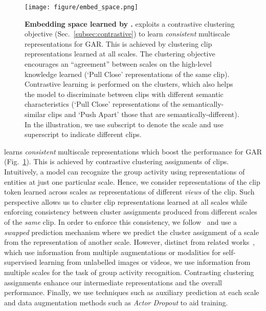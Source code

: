 \documentclass[runningheads]{llncs}
\begin{document}
 
\begin{figure}[t]
\centering
    \texttt{[image: figure/embed\_space.png]}
    \caption{\textbf{Embedding space learned by \ourseos.}
	 \ours exploits a contrastive clustering objective (Sec.~\ref{subsec:contrastive}) to learn \textit{consistent} multiscale representations for GAR. This is achieved
	 by clustering clip representations learned at all scales.
	 The clustering objective encourages an ``agreement'' between scales on the high-level knowledge learned (`Pull Close' representations of the same clip).  Contrastive learning is performed on the clusters, which also helps the model to discriminate between clips 
	 with different semantic characteristics (`Pull Close' representations of the semantically-similar clips and `Push Apart' those that are semantically-different). 
	 In the illustration, we use subscript to denote the scale and use superscript to indicate different clips.}
\label{fig:embedding_space}
\end{figure} 


\ours learns 
\textit{consistent} multiscale representations
which boost the performance for GAR (Fig.~\ref{fig:embedding_space}). This is achieved by
contrastive clustering assignments of clips.
Intuitively,  a model can recognize the group activity using 
representations of entities at just one particular scale. Hence, we consider representations of the clip token learned across scales as representations of different \textit{views} of the clip.  
Such perspective allows us to cluster clip representations learned at all scales while enforcing consistency between cluster assignments produced from different scales of the \textit{same} clip. 
In order to enforce this consistency, we follow~\cite{swav} and use a \emph{swapped} prediction mechanism where we predict the cluster assignment of a scale from the representation of another scale.
However, distinct from related works~\cite{swav,asano2020labelling,chen2021multimodal},
which use information from
multiple augmentations or modalities for self-supervised learning from unlabelled images or videos,
we use information from multiple scales for the task of group activity recognition.
Contrasting clustering assignments enhance
our intermediate representations and the overall performance. 
Finally, we use techniques such as auxiliary prediction at each scale
and data augmentation methods
such as \textit{Actor Dropout} 
to aid training.
\end{document}
